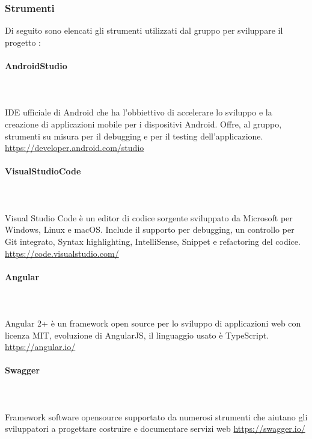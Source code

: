 \subsubsection{Strumenti}
Di seguito sono elencati gli strumenti utilizzati dal gruppo per sviluppare il progetto :

\paragraph{AndroidStudio}\mbox{}\\ \\
IDE ufficiale di Android che ha l'obbiettivo di accelerare lo sviluppo e la creazione di applicazioni mobile per i dispositivi Android.
Offre, al gruppo,  strumenti su misura per il debugging e per il testing dell'applicazione.
\href{https://developer.android.com/studio}{https://developer.android.com/studio}

\paragraph{VisualStudioCode}\mbox{}\\ \\
Visual Studio Code è un editor di codice sorgente sviluppato da Microsoft per Windows, Linux e macOS. Include il supporto per debugging, un controllo per Git integrato, Syntax highlighting, IntelliSense, Snippet e refactoring del codice.
\href{https://code.visualstudio.com/}{https://code.visualstudio.com/}

\paragraph{Angular}\mbox{}\\ \\
Angular 2+ è un framework open source per lo sviluppo di applicazioni web con licenza MIT, evoluzione di AngularJS, il linguaggio usato è TypeScript.
\href{https://angular.io/}{https://angular.io/}

\paragraph{Swagger}\mbox{}\\ \\
Framework software opensource supportato da numerosi strumenti che aiutano gli sviluppatori a progettare costruire e documentare servizi web 
\href{https://swagger.io/}{https://swagger.io/}

